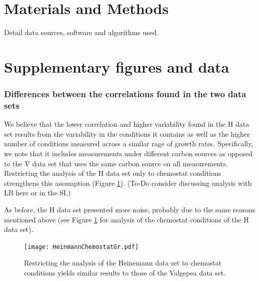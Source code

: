 \documentclass[notitlepage]{article}
\begin{document}
\section{Materials and Methods}
Detail data sources, software and algorithms used.

\section{Supplementary figures and data}
\subsubsection{Differences between the correlations found in the two data sets}
\label{heinemannchemo}
We believe that the lower correlation and higher variability found in the H data set results from the variability in the conditions it contains as well as the higher number of conditions measured across a similar rage of growth rates.
Specifically, we note that it includes measurements under different carbon sources as opposed to the V data set that uses the same carbon source on all measurements.
Restricting the analysis of the H data set only to chemostat conditions strengthens this assumption (Figure \ref{fig:growthcorrchemo}).
(To-Do consider discussing analysis with LB here or in the SI.)

As before, the H data set presented more noise, probably due to the same reasons mentioned above (see Figure \ref{fig:growthcorrchemo} for analysis of the chemostat conditions of the H data set).

\begin{figure}[h]
\centering
\texttt{[image: HeinmannChemostatGr.pdf]}
\caption{
  Restricting the analysis of the Heinemann data set to chemostat conditions yields similar results to those of the Valgepea data set.
}
\label{fig:growthcorrchemo}
\end{figure}
\end{document}
